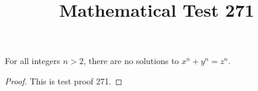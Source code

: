 \documentclass{amsart}
\begin{document}
\title{Mathematical Test 271}
\begin{theorem}
For all integers $n > 2$, there are no solutions to $x^n + y^n = z^n$.
\end{theorem}
\begin{proof}
This is test proof 271.
\end{proof}
\end{document}
